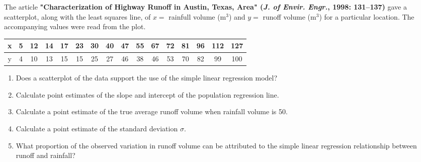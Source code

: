 \documentclass[11pt,letterpaper,boxed]{hmcpset}
\begin{document}
\begin{problem}[12.2.16]
	The article \textbf{"Characterization of Highway Runoff in Austin, Texas, Area" (\emph{J. of Envir. Engr.}, 1998: 131--137)} gave a scatterplot, along with the least squares line, of $x =$ rainfull volume (m$^3$) and $y =$ runoff volume (m$^3$) for a particular location. The accompanying values were read from the plot.
	\begin{center}
	\begin{tabular}{c | c c c c c c c c c c c c c c c}
		x & 5 & 12 & 14 & 17 & 23 & 30 & 40 & 47 & 55 & 67 & 72 & 81 & 96 & 112 & 127 \\
		\hline
		y & 4 & 10 & 13 & 15 & 15 & 25 & 27 & 46 & 38 & 46 & 53 & 70 & 82 & 99 & 100\\
	\end{tabular}
	\end{center}
	\begin{enumerate}
		\item
			Does a scatterplot of the data support the use of the simple linear regression model?
		\item
			Calculate point estimates of the slope and intercept of the population regression line.
		\item
			Calculate a point estimate of the true average runoff volume when rainfall volume is 50.
		\item
			Calculate a point estimate of the standard deviation $\sigma$.
		\item
			What proportion of the observed variation in runoff volume can be attributed to the simple linear regression relationship between runoff and rainfall?
	\end{enumerate}
\end{problem}

\begin{solution}
	\vfill
\end{solution}
\newpage

\end{document}
